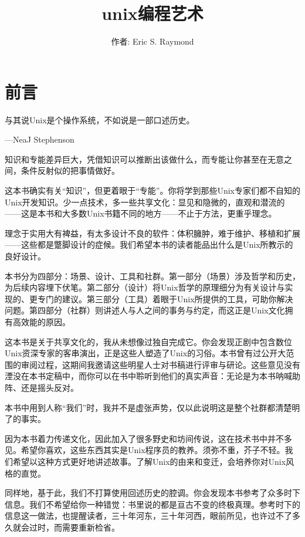 \documentclass[12pt,oneside]{book}
\title{unix编程艺术}
\author{作者: Eric S. Raymond}
\begin{document}
\maketitle
\tableofcontents


\chapter*{前言}

\begin{flushright}
与其说Unix是个操作系统，不如说是一部口述历史。

{\hfill —NeaJ Stephenson}
\end{flushright}

知识和专能差异巨大，凭借知识可以推断出该做什么，而专能让你甚至在无意之间，条件反射似的把事情做好。

这本书确实有关“知识”，但更着眼于“专能”。你将学到那些Unix专家们都不自知的Unix开发知识。少一点技术，多一些共享文化：显见和隐微的，直观和潜流的——这是本书和大多数Unix书籍不同的地方——不止于方法，更重乎理念。

理念于实用大有裨益，有太多设计不良的软件：体积臃肿，难于维护、移植和扩展——这些都是蹩脚设计的症候。我们希望本书的读者能品出什么是Unix所教示的良好设计。

本书分为四部分：场景、设计、工具和社群。第一部分（场景）涉及哲学和历史，为后续内容埋下伏笔。第二部分（设计）将Unix哲学的原理细分为有关设计与实现的、更专门的建议。第三部分（工具）着眼于Unix所提供的工具，可助你解决问题。第四部分（社群）则讲述人与人之间的事务与约定，而这正是Unix文化拥有高效能的原因。

这本书是关于共享文化的，我从未想像过独自完成它。你会发现正剧中包含数位Unix资深专家的客串演出，正是这些人塑造了Unix的习俗。本书曾有过公开大范围的审阅过程，这期间我邀请这些明星人士对书稿进行评审与研论。这些意见没有湮没在本书定稿中，而你可以在书中聆听到他们的真实声音：无论是为本书呐喊助阵、还是摇头反对。

本书中用到人称“我们”时，我并不是虚张声势，仅以此说明这是整个社群都清楚明了的事实。

因为本书着力传递文化，因此加入了很多野史和坊间传说，这在技术书中并不多见。希望你喜欢，这些东西其实是Unix程序员的教养。须弥不重，芥子不轻。我们希望以这种方式更好地讲述故事。了解Unix的由来和变迁，会培养你对Unix风格的直觉。

同样地，基于此，我们不打算使用回述历史的腔调。你会发现本书参考了众多时下信息。我们不希望给你一种错觉：书里说的都是亘古不变的终极真理。参考时下的信息这一做法，也提醒读者，三十年河东，三十年河西，眼前所见，也许过不了多久就会过时，而需要重新检省。
\end{document}

